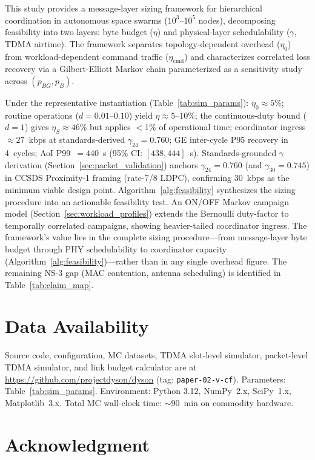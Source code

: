 \documentclass[journal]{IEEEtran}
\begin{document}
This study provides a message-layer sizing framework for hierarchical coordination in autonomous space swarms ($10^3$--$10^5$ nodes), decomposing feasibility into two layers: byte budget ($\eta$) and physical-layer schedulability ($\gamma$, TDMA airtime). The framework separates topology-dependent overhead ($\eta_0$) from workload-dependent command traffic ($\eta_{\text{cmd}}$) and characterizes correlated loss recovery via a Gilbert-Elliott Markov chain parameterized as a sensitivity study across $(p_{BG}, p_B)$.

Under the representative instantiation (Table~\ref{tab:sim_params}): $\eta_0 \approx 5\%$; routine operations ($d = 0.01$--$0.10$) yield $\eta \approx 5$--$10\%$; the continuous-duty bound ($d = 1$) gives $\eta_S \approx 46\%$ but applies $<$1\% of operational time; coordinator ingress ${\approx}27$~kbps at standards-derived $\gamma_{24} = 0.760$; GE inter-cycle P95 recovery in 4~cycles; AoI P99~$= 440$~s (95\% CI: $[438, 444]$~s). Standards-grounded $\gamma$ derivation (Section~\ref{sec:packet_validation}) anchors $\gamma_{24} = 0.760$ (and $\gamma_{30} = 0.745$) in CCSDS Proximity-1 framing (rate-7/8 LDPC), confirming 30~kbps as the minimum viable design point. Algorithm~\ref{alg:feasibility} synthesizes the sizing procedure into an actionable feasibility test. An ON/OFF Markov campaign model (Section~\ref{sec:workload_profiles}) extends the Bernoulli duty-factor to temporally correlated campaigns, showing heavier-tailed coordinator ingress. The framework's value lies in the complete sizing procedure---from message-layer byte budget through PHY schedulability to coordinator capacity (Algorithm~\ref{alg:feasibility})---rather than in any single overhead figure. The remaining NS-3 gap (MAC contention, antenna scheduling) is identified in Table~\ref{tab:claim_map}.

\section*{Data Availability}

Source code, configuration, MC datasets, TDMA slot-level simulator, packet-level TDMA simulator, and link budget calculator are at \url{https://github.com/projectdyson/dyson} (tag: \texttt{paper-02-v-cf}). Parameters: Table~\ref{tab:sim_params}. Environment: Python 3.12, NumPy~2.x, SciPy~1.x, Matplotlib~3.x. Total MC wall-clock time: ${\sim}90$~min on commodity hardware.

\section*{Acknowledgment}
\end{document}
